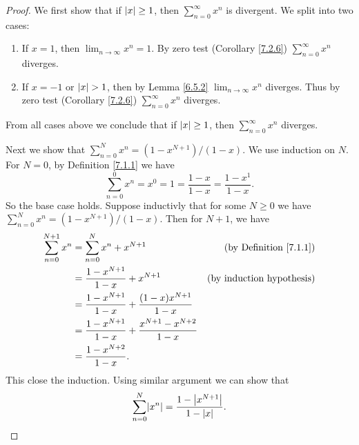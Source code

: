 \begin{proof}
    We first show that if \(\abs*{x} \geq 1\), then \(\sum_{n = 0}^\infty x^n\) is divergent.
    We split into two cases:
    \begin{enumerate}
        \item If \(x = 1\), then \(\lim_{n \to \infty} x^n = 1\). By zero test (Corollary \ref{7.2.6}) \(\sum_{n = 0}^\infty x^n\) diverges.
        \item If \(x = -1\) or \(\abs*{x} > 1\), then by Lemma \ref{6.5.2} \(\lim_{n \to \infty} x^n\) diverges.
              Thus by zero test (Corollary \ref{7.2.6}) \(\sum_{n = 0}^\infty x^n\) diverges.
    \end{enumerate}
    From all cases above we conclude that if \(\abs*{x} \geq 1\), then \(\sum_{n = 0}^\infty x^n\) diverges.

    Next we show that \(\sum_{n = 0}^N x^n = (1 - x^{N + 1}) / (1 - x)\).
    We use induction on \(N\).
    For \(N = 0\), by Definition \ref{7.1.1} we have
    \[
        \sum_{n = 0}^0 x^n = x^0 = 1 = \frac{1 - x}{1 - x} = \frac{1 - x^1}{1 - x}.
    \]
    So the base case holds.
    Suppose inductivly that for some \(N \geq 0\) we have \(\sum_{n = 0}^N x^n = (1 - x^{N + 1}) / (1 - x)\).
    Then for \(N + 1\), we have
    \begin{align*}
        \sum_{n = 0}^{N + 1} x^n & = \sum_{n = 0}^N x^n + x^{N + 1}                                    & \text{(by Definition \ref{7.1.1})} \\
                                 & = \frac{1 - x^{N + 1}}{1 - x} + x^{N + 1}                           & \text{(by induction hypothesis)}   \\
                                 & = \frac{1 - x^{N + 1}}{1 - x} + \frac{(1 - x) x^{N + 1}}{1 - x}                                          \\
                                 & = \frac{1 - x^{N + 1}}{1 - x} + \frac{x^{N + 1} - x^{N + 2}}{1 - x}                                      \\
                                 & = \frac{1 - x^{N + 2}}{1 - x}.
    \end{align*}
    This close the induction.
    Using similar argument we can show that
    \[
        \sum_{n = 0}^N \abs*{x^n} = \frac{1 - \abs*{x^{N + 1}}}{1 - \abs*{x}}.
    \]


\end{proof}
